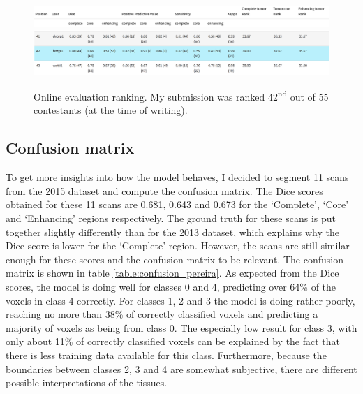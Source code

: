 \documentclass[12pt,a4paper,twoside,openright]{report}
\begin{document}
\begin{figure}
	\centering
	\includegraphics[width=\textwidth]{ranking_table_header}
	\includegraphics[width=\textwidth]{pereira_model_ranked_results}
	\caption[Online evaluation ranking.]{Online evaluation ranking. My submission was ranked 42\textsuperscript{nd} out of 55 contestants (at the time of writing).}
	\label{fig:online_eval_rank}
\end{figure}

\subsection{Confusion matrix}
To get more insights into how the model behaves, I decided to segment 11 scans from the 2015 dataset and compute the confusion matrix. The Dice scores obtained for these 11 scans are 0.681, 0.643 and 0.673 for the `Complete', `Core' and `Enhancing' regions respectively. The ground truth for these scans is put together slightly differently than for the 2013 dataset, which explains why the Dice score is lower for the `Complete' region. However, the scans are still similar enough for these scores and the confusion matrix to be relevant. The confusion matrix is shown in table \ref{table:confusion_pereira}. As expected from the Dice scores, the model is doing well for classes 0 and 4, predicting over 64\% of the voxels in class 4 correctly. For classes 1, 2 and 3 the model is doing rather poorly, reaching no more than 38\% of correctly classified voxels and predicting a majority of voxels as being from class 0. The especially low result for class 3, with only about 11\% of correctly classified voxels can be explained by the fact that there is less training data available for this class. Furthermore, because the boundaries between classes 2, 3 and 4 are somewhat subjective, there are different possible interpretations of the tissues.
\end{document}

